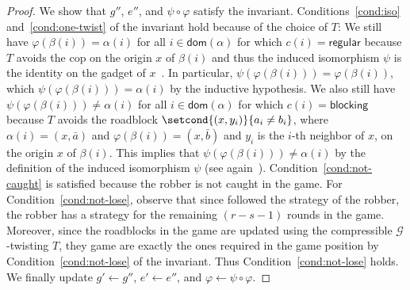 \documentclass[a4paper,english, thm-restate]{lipics-v2021}
\newcommand{\regular}{\mathsf{regular}}
\newcommand{\blocking}{\mathsf{blocking}}
\renewcommand{\phi}{\varphi}
\newcommand{\tup}[1]{\bar{#1}}
\newcommand{\graphG}{\mathcal{G}}
\newcommand{\dom}{\mathsf{dom}}
\begin{document}
\begin{proof}
        We show that $g''$, $e''$, and $\psi \circ \phi$ satisfy the invariant.
        Conditions~\ref{cond:iso} and~\ref{cond:one-twist} of the invariant hold because
        of the choice of $T$:
        We still have $\phi(\beta(i)) = \alpha(i)$ for all $i \in \dom(\alpha)$ for which $c(i) = \regular$ because $T$ avoids the cop on the origin $x$ of $\beta(i)$ and thus the induced isomorphism $\psi$ is the identity on the gadget of $x$~\cite[Lemma 13]{DBLP:conf/focs/GroheLNS23}.
        In particular, $\psi(\phi(\beta(i))) = \phi(\beta(i))$, which $\psi(\phi(\beta(i))) = \alpha(i)$ by the inductive hypothesis.
        We also still have $\psi(\phi(\beta(i))) \neq \alpha(i)$ for all $i \in \dom(\alpha)$ for which $c(i) = \blocking$ because $T$ avoids the roadblock $\setcond{(x,y_i)} { a_i \neq b_i}$, where $\alpha(i) = (x,\tup{a})$ and $\phi(\beta(i)) = (x, \tup{b})$ and $y_i$ is the $i$-th neighbor of $x$, on the origin $x$ of $\beta(i)$. This implies that $\psi(\phi(\beta(i))) \neq \alpha(i)$ by the definition of the induced isomorphism $\psi$ (see again~\cite{DBLP:conf/focs/GroheLNS23}).
        Condition~\ref{cond:not-caught} is satisfied because the robber is not caught in the game.
For Condition~\ref{cond:not-lose}, observe that since followed the strategy of the robber, the robber has a  strategy for the remaining $(r-s-1)$ rounds in the game. Moreover, since the roadblocks in the game are updated using the compressible $\graphG$-twisting $T$, they 
        game are exactly the ones required in the game position by Condition~\ref{cond:not-lose} of the invariant.
      Thus Condition~\ref{cond:not-lose} holds.
        We finally update $g' \leftarrow g''$, $e' \leftarrow e''$, and $\phi \leftarrow \psi \circ \phi$.
        

\end{proof}
\end{document}
